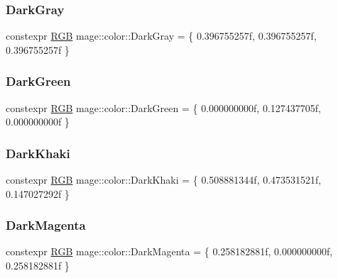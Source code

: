 \subsubsection{\texorpdfstring{Dark\+Gray}{DarkGray}}
{\footnotesize\ttfamily constexpr \mbox{\hyperlink{structmage_1_1_r_g_b}{R\+GB}} mage\+::color\+::\+Dark\+Gray = \{ 0.\+396755257f, 0.\+396755257f, 0.\+396755257f \}}

\mbox{\label{namespacemage_1_1color_a810f271efcbd9574bec9076a18c30476}} 
\subsubsection{\texorpdfstring{Dark\+Green}{DarkGreen}}
{\footnotesize\ttfamily constexpr \mbox{\hyperlink{structmage_1_1_r_g_b}{R\+GB}} mage\+::color\+::\+Dark\+Green = \{ 0.\+000000000f, 0.\+127437705f, 0.\+000000000f \}}

\mbox{\label{namespacemage_1_1color_a1673eb9031256e1ba8f8438168803eef}} 
\subsubsection{\texorpdfstring{Dark\+Khaki}{DarkKhaki}}
{\footnotesize\ttfamily constexpr \mbox{\hyperlink{structmage_1_1_r_g_b}{R\+GB}} mage\+::color\+::\+Dark\+Khaki = \{ 0.\+508881344f, 0.\+473531521f, 0.\+147027292f \}}

\mbox{\label{namespacemage_1_1color_a6a72bd256475a691285a9ac994d95361}} 
\subsubsection{\texorpdfstring{Dark\+Magenta}{DarkMagenta}}
{\footnotesize\ttfamily constexpr \mbox{\hyperlink{structmage_1_1_r_g_b}{R\+GB}} mage\+::color\+::\+Dark\+Magenta = \{ 0.\+258182881f, 0.\+000000000f, 0.\+258182881f \}}

\mbox{\label{namespacemage_1_1color_adb31ce54111ec7b2643ee262367b60a3}} 
